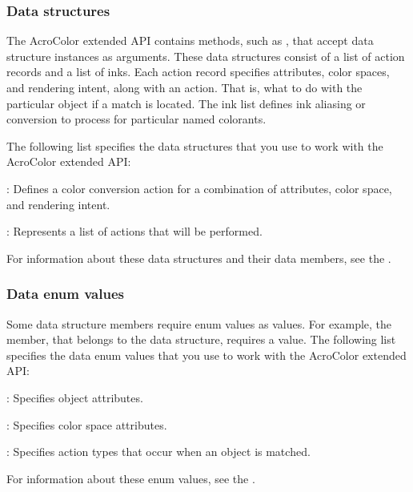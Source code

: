 \documentclass[letterpaper,12pt,english,openany,oneside]{sphinxmanual}
\begin{document}
\subsubsection{Data structures}
\label{\detokenize{Plugins_ExtendedAPI:data-structures}}
The AcroColor extended API contains methods, such as , that accept data structure instances as arguments. These data structures consist of a list of action records and a list of inks. Each action record specifies attributes, color spaces, and rendering intent, along with an action. That is, what to do with the particular object if a match is located. The ink list defines ink aliasing or conversion to process for particular named colorants.

The following list specifies the data structures that you use to work with the AcroColor extended API:

: Defines a color conversion action for a combination of attributes, color space, and rendering intent.

: Represents a list of actions that will be performed.

For information about these data structures and their data members, see the .


\subsubsection{Data enum values}
\label{\detokenize{Plugins_ExtendedAPI:data-enum-values}}
Some data structure members require enum values as values. For example, the  member, that belongs to the  data structure, requires a  value. The following list specifies the data enum values that you use to work with the AcroColor extended API:

: Specifies object attributes.

: Specifies color space attributes.

: Specifies action types that occur when an object is matched.

For information about these enum values, see the .
\end{document}

